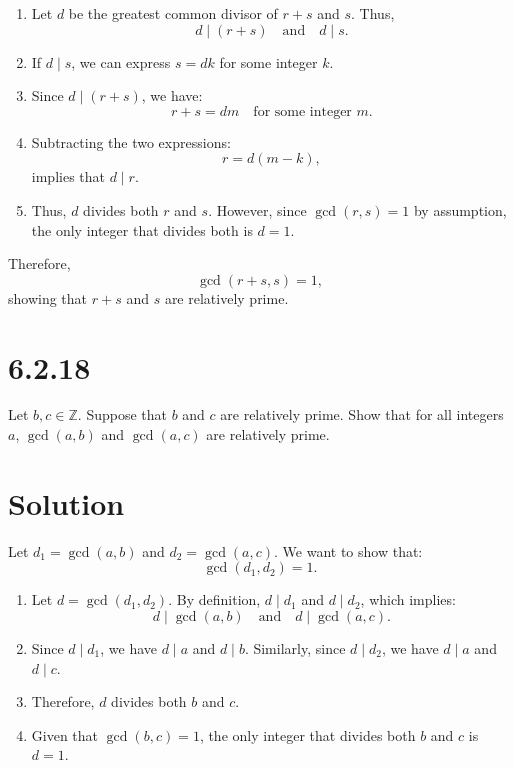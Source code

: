 \documentclass{article}
\begin{document}
\begin{enumerate}
    \item Let \( d \) be the greatest common divisor of \( r + s \) and \( s \). Thus,
    \[
    d \mid (r + s) \quad \text{and} \quad d \mid s.
    \]

    \item If \( d \mid s \), we can express \( s = d k \) for some integer \( k \).

    \item Since \( d \mid (r + s) \), we have:
    \[
    r + s = d m \quad \text{for some integer } m.
    \]

    \item Subtracting the two expressions:
    \[
    r = d (m - k),
    \]
    implies that \( d \mid r \).

    \item Thus, \( d \) divides both \( r \) and \( s \). However, since \( \gcd(r, s) = 1 \) by assumption, the only integer that divides both is \( d = 1 \).
\end{enumerate}

Therefore,
\[
\gcd(r + s, s) = 1,
\]
showing that \( r + s \) and \( s \) are relatively prime.

\section*{6.2.18}
Let \( b, c \in \mathbb{Z} \). Suppose that \( b \) and \( c \) are relatively prime. Show that for all integers \( a \), \(\gcd(a, b)\) and \(\gcd(a, c)\) are relatively prime.

\section*{Solution}
Let \( d_1 = \gcd(a, b) \) and \( d_2 = \gcd(a, c) \). We want to show that:
\[
\gcd(d_1, d_2) = 1.
\]

\begin{enumerate}
    \item Let \( d = \gcd(d_1, d_2) \). By definition, \( d \mid d_1 \) and \( d \mid d_2 \), which implies:
    \[
    d \mid \gcd(a, b) \quad \text{and} \quad d \mid \gcd(a, c).
    \]

    \item Since \( d \mid d_1 \), we have \( d \mid a \) and \( d \mid b \). Similarly, since \( d \mid d_2 \), we have \( d \mid a \) and \( d \mid c \).

    \item Therefore, \( d \) divides both \( b \) and \( c \).

    \item Given that \( \gcd(b, c) = 1 \), the only integer that divides both \( b \) and \( c \) is \( d = 1 \).
\end{enumerate}
\end{document}
